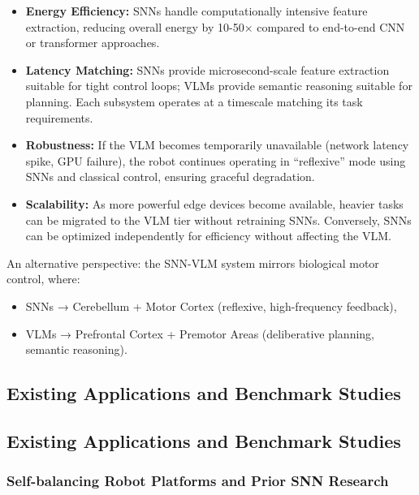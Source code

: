 \begin{itemize}
    \item \textbf{Energy Efficiency:} SNNs handle computationally intensive feature extraction, reducing overall 
    energy by 10-50× compared to end-to-end CNN or transformer approaches.
    
    \item \textbf{Latency Matching:} SNNs provide microsecond-scale feature extraction suitable for tight control 
    loops; VLMs provide semantic reasoning suitable for planning. Each subsystem operates at a timescale matching 
    its task requirements.
    
    \item \textbf{Robustness:} If the VLM becomes temporarily unavailable (network latency spike, GPU failure), 
    the robot continues operating in ``reflexive'' mode using SNNs and classical control, ensuring graceful degradation.
    
    \item \textbf{Scalability:} As more powerful edge devices become available, heavier tasks can be migrated to 
    the VLM tier without retraining SNNs. Conversely, SNNs can be optimized independently for efficiency without 
    affecting the VLM.
\end{itemize}

An alternative perspective: the SNN-VLM system mirrors biological motor control, where:
\begin{itemize}
    \item SNNs → Cerebellum + Motor Cortex (reflexive, high-frequency feedback),
    \item VLMs → Prefrontal Cortex + Premotor Areas (deliberative planning, semantic reasoning).
\end{itemize}


\subsection{Existing Applications and Benchmark Studies}

\subsection{Existing Applications and Benchmark Studies}

\subsubsection{Self-balancing Robot Platforms and Prior SNN Research}

